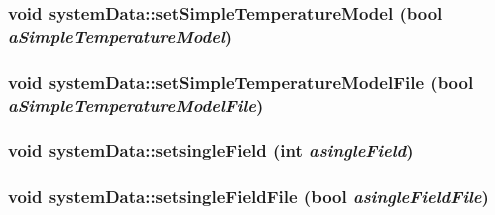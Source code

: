 \hypertarget{classsystem_data_ac75d94ecb9eea357540fdfc921cdfe6b}{
\subsubsection[{setSimpleTemperatureModel}]{\setlength{\rightskip}{0pt plus 5cm}void systemData::setSimpleTemperatureModel (bool {\em aSimpleTemperatureModel})}}
\label{classsystem_data_ac75d94ecb9eea357540fdfc921cdfe6b}
\hypertarget{classsystem_data_a4fa3efc09031a02d90263399038a6bcb}{
\subsubsection[{setSimpleTemperatureModelFile}]{\setlength{\rightskip}{0pt plus 5cm}void systemData::setSimpleTemperatureModelFile (bool {\em aSimpleTemperatureModelFile})}}
\label{classsystem_data_a4fa3efc09031a02d90263399038a6bcb}
\hypertarget{classsystem_data_add68e8aad7e73a9e477330bbc9839c05}{
\subsubsection[{setsingleField}]{\setlength{\rightskip}{0pt plus 5cm}void systemData::setsingleField (int {\em asingleField})}}
\label{classsystem_data_add68e8aad7e73a9e477330bbc9839c05}
\hypertarget{classsystem_data_a97e7e9ac45009f3d1afcd103c70a15ab}{
\subsubsection[{setsingleFieldFile}]{\setlength{\rightskip}{0pt plus 5cm}void systemData::setsingleFieldFile (bool {\em asingleFieldFile})}}
